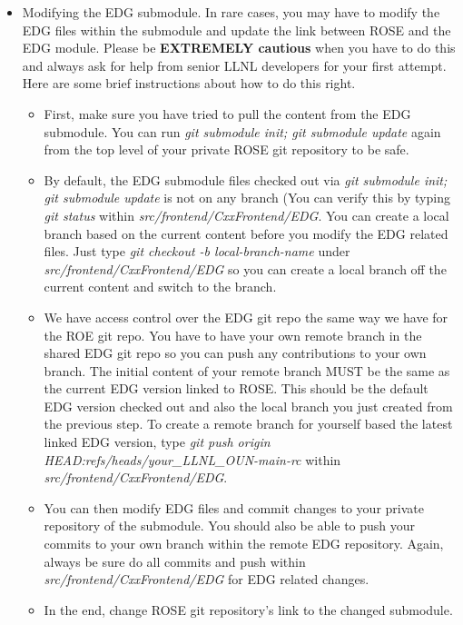 \begin{itemize}
\begin{itemize}
   \end{itemize}

\item Modifying the EDG submodule. In rare cases, you may have to modify the EDG files within the submodule and update the link between ROSE and the EDG module. Please be {\bf EXTREMELY cautious} when you have to do this and always
ask for help from senior LLNL developers for your first attempt. Here are some brief instructions about how to do this right.
     \begin{itemize}

  \item First, make sure you have tried to pull the content from the EDG submodule. You can run \textit{git submodule init; git submodule update} again from the top level of your private ROSE git repository to be safe. 
  \item By default, the EDG submodule files checked out via \textit{git submodule init; git submodule update} is not on any branch (You can verify this by typing \textit{git status} within \textit{src/frontend/CxxFrontend/EDG}.  
You can create a local branch based on the current content before you modify the EDG related files. Just type \textit{git checkout -b local-branch-name} under \textit{src/frontend/CxxFrontend/EDG} so you can create a local branch off the current content and switch to the branch.
   \item We have access control over the EDG git repo the same way we have
   for the ROE git repo. You have to have your own remote branch in
   the shared EDG git repo so you can push any contributions to your own
   branch. The initial content of your remote branch
   MUST be the same as the current EDG version linked to ROSE. This
   should be the default EDG version checked out and also the local branch
   you just created from the previous step. To create a remote branch for
   yourself based the latest linked EDG version, type 
   \textit{git push origin HEAD:refs/heads/your\_LLNL\_OUN-main-rc} within \textit{src/frontend/CxxFrontend/EDG}.
   \item You can then modify EDG files and commit changes to your private repository of the submodule. 
         You should also be able to push your commits to your own branch
         within the remote EDG repository.
         Again, always be sure do all commits and push within \textit{src/frontend/CxxFrontend/EDG} for EDG related changes. 
   \item In the end, change ROSE git repository's link to the changed submodule. 

\end{itemize}
\end{itemize}
